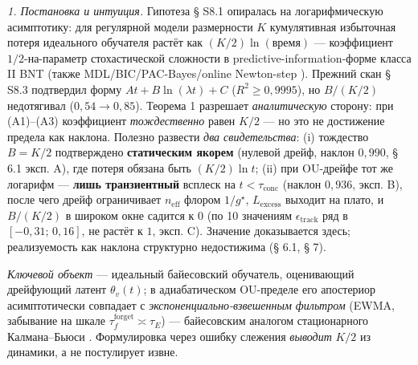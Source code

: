 \documentclass[12pt]{iopart}
\begin{document}
\emph{1. Постановка и интуиция.} Гипотеза § S8.1 \cite{Andriishin2026b} опиралась на логарифмическую асимптотику: для регулярной модели размерности \(K\) кумулятивная избыточная потеря идеального обучателя растёт как \((K/2)\ln(\text{время})\) --- коэффициент \(1/2\)-на-параметр стохастической сложности \cite{Rissanen1986,ClarkeBarron1990,Schwarz1978} в predictive-information-форме класса II BNT \cite{BialekNemenmanTishby2001} (также MDL/BIC/PAC-Bayes/online Newton-step \cite{Schwarz1978,McAllester1999,Hazan2007}). Прежний скан \cite{Andriishin2026b} § S8.3 подтвердил форму \(A t + B\ln(\lambda t) + C\) (\(R^2 \ge 0{,}9995\)), но \(B/(K/2)\) недотягивал (\(0{,}54 \to 0{,}85\)). Теорема 1 разрешает \emph{аналитическую} сторону: при (A1)--(A3) коэффициент \emph{тождественно} равен \(K/2\) --- но это не достижение предела как наклона. Полезно развести \emph{два свидетельства}: (i) тождество \(B = K/2\) подтверждено \textbf{статическим якорем} (нулевой дрейф, наклон \(0{,}990\), § 6.1 эксп. A), где потеря обязана быть \((K/2)\ln t\); (ii) при OU-дрейфе тот же логарифм --- \textbf{лишь транзиентный} всплеск на \(t < \tau_{\text{conc}}\) (наклон \(0{,}936\), эксп. B), после чего дрейф ограничивает \(n_{\text{eff}}\) флором \(1/g^\star\), \(L_{\text{excess}}\) выходит на плато, и \(B/(K/2)\) в широком окне садится к \(0\) (по 10 значениям \(\epsilon_{\text{track}}\) ряд в \([-0{,}31;\,0{,}16]\), не растёт к \(1\), эксп. C). Значение доказывается здесь; реализуемость как наклона структурно недостижима (§ 6.1, § 7).



\emph{Ключевой объект} --- идеальный байесовский обучатель, оценивающий дрейфующий латент \(\theta_v(t)\); в адиабатическом OU-пределе его апостериор асимптотически совпадает с \emph{экспоненциально-взвешенным фильтром} (EWMA, забывание на шкале \(\tau_f^{\text{forget}} \asymp \tau_E\)) --- байесовским аналогом стационарного Калмана--Бьюси \cite{KalmanBucy1961,AndersonMoore1979}. Формулировка через ошибку слежения \emph{выводит} \(K/2\) из динамики, а не постулирует извне.
\end{document}
